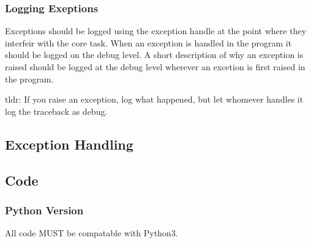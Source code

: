 \subsubsection*{Logging Exeptions}

Exceptions should be logged using the exception handle at the point where they interfeir with the core task. When an exception is handled in the program it should be logged on the debug level. A short description of why an exception is raised should be logged at the debug level wherever an excetion is first raised in the program.

tldr\+: If you raise an exception, log what happened, but let whomever handles it log the traceback as debug.

\subsection*{Exception Handling}

\subsection*{Code}

\subsubsection*{Python Version}

All code M\+U\+S\+T be compatable with Python3. 